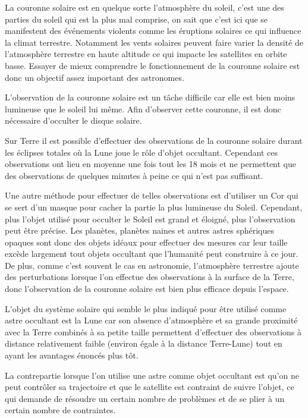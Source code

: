 \documentclass[11pt]{article} %
\begin{document}
		La couronne solaire est en quelque sorte l'atmosphère du soleil, c'est une des parties du soleil qui est la plus mal comprise, on sait que c'est ici que se manifestent des événements violents comme les éruptions solaires ce qui influence la climat terrestre. Notamment les vents solaires peuvent faire varier la densité de l'atmosphère terrestre en haute altitude ce qui impacte les satellites en orbite basse. Essayer de mieux comprendre le fonctionnement de la couronne solaire est donc un objectif assez important des astronomes.
		
		L'observation de la couronne solaire est un tâche difficile car elle est bien moins lumineuse que le soleil lui même. Afin d'observer cette couronne, il est donc nécessaire d'occulter le disque solaire.
		
		Sur Terre il est possible d'effectuer des observations de la couronne solaire durant les éclipses totales où la Lune joue le rôle d'objet occultant. Cependant ces observations ont lieu en moyenne une fois tout les 18 mois et ne permettent que des observations de quelques minutes à peine ce qui n'est pas suffisant.
		
		Une autre méthode pour effectuer de telles observations est d'utiliser un \gls{Cor} qui se sert d'un masque pour cacher la partie la plus lumineuse du Soleil. Cependant, plus l'objet utilisé pour occulter le Soleil est grand et éloigné, plus l'observation peut être précise. Les planètes, planètes naines et autres astres sphériques opaques sont donc des objets idéaux pour effectuer des mesures car leur taille excède largement tout objets occultant que l'humanité peut construire à ce jour. De plus, comme c'est souvent le cas en astronomie, l'atmosphère terrestre ajoute des perturbations lorsque l'on effectue des observations à la surface de la Terre, donc l'observation de la couronne solaire est bien plus efficace depuis l'espace.
		
		L'objet du système solaire qui semble le plus indiqué pour être utilisé comme astre occultant est la Lune car son absence d'atmosphère et sa grande proximité avec la Terre combinés à sa petite taille permettent d'effectuer des observations à distance relativement faible (environ égale à la distance Terre-Lune) tout en ayant les avantages énoncés plus tôt.
		 
		La contrepartie lorsque l'on utilise une astre comme objet occultant est qu'on ne peut contrôler sa trajectoire et que le satellite est contraint de suivre l'objet, ce qui demande de résoudre un certain nombre de problèmes et de se plier à un certain nombre de contraintes.
		
\end{document}
